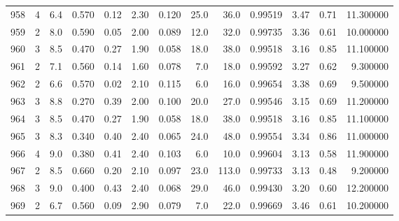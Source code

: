 \begin{tabular}{lrrrrrrrrrrrr}
958  &        4 &            6.4 &             0.570 &         0.12 &            2.30 &      0.120 &                 25.0 &                  36.0 &  0.99519 &  3.47 &       0.71 &  11.300000 \\
959  &        2 &            8.0 &             0.590 &         0.05 &            2.00 &      0.089 &                 12.0 &                  32.0 &  0.99735 &  3.36 &       0.61 &  10.000000 \\
960  &        3 &            8.5 &             0.470 &         0.27 &            1.90 &      0.058 &                 18.0 &                  38.0 &  0.99518 &  3.16 &       0.85 &  11.100000 \\
961  &        2 &            7.1 &             0.560 &         0.14 &            1.60 &      0.078 &                  7.0 &                  18.0 &  0.99592 &  3.27 &       0.62 &   9.300000 \\
962  &        2 &            6.6 &             0.570 &         0.02 &            2.10 &      0.115 &                  6.0 &                  16.0 &  0.99654 &  3.38 &       0.69 &   9.500000 \\
963  &        3 &            8.8 &             0.270 &         0.39 &            2.00 &      0.100 &                 20.0 &                  27.0 &  0.99546 &  3.15 &       0.69 &  11.200000 \\
964  &        3 &            8.5 &             0.470 &         0.27 &            1.90 &      0.058 &                 18.0 &                  38.0 &  0.99518 &  3.16 &       0.85 &  11.100000 \\
965  &        3 &            8.3 &             0.340 &         0.40 &            2.40 &      0.065 &                 24.0 &                  48.0 &  0.99554 &  3.34 &       0.86 &  11.000000 \\
966  &        4 &            9.0 &             0.380 &         0.41 &            2.40 &      0.103 &                  6.0 &                  10.0 &  0.99604 &  3.13 &       0.58 &  11.900000 \\
967  &        2 &            8.5 &             0.660 &         0.20 &            2.10 &      0.097 &                 23.0 &                 113.0 &  0.99733 &  3.13 &       0.48 &   9.200000 \\
968  &        3 &            9.0 &             0.400 &         0.43 &            2.40 &      0.068 &                 29.0 &                  46.0 &  0.99430 &  3.20 &       0.60 &  12.200000 \\
969  &        2 &            6.7 &             0.560 &         0.09 &            2.90 &      0.079 &                  7.0 &                  22.0 &  0.99669 &  3.46 &       0.61 &  10.200000 \\

\end{tabular}
